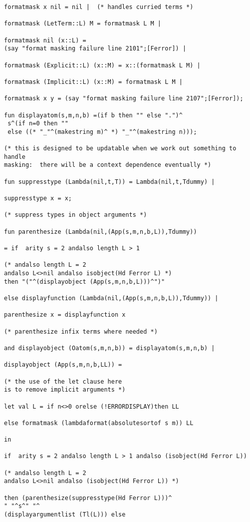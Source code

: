 \documentclass[12pt]{article}
\begin{document}
\begin{verbatim}
formatmask x nil = nil |  (* handles curried terms *)

formatmask (LetTerm::L) M = formatmask L M |

formatmask nil (x::L) = 
(say "format masking failure line 2101";[Ferror]) |

formatmask (Explicit::L) (x::M) = x::(formatmask L M) |

formatmask (Implicit::L) (x::M) = formatmask L M |

formatmask x y = (say "format masking failure line 2107";[Ferror]);

fun displayatom(s,m,n,b) =(if b then "" else ".")^
 s^(if n=0 then "" 
 else ((* "_"^(makestring m)^ *) "_"^(makestring n)));

(* this is designed to be updatable when we work out something to handle
masking:  there will be a context dependence eventually *)

fun suppresstype (Lambda(nil,t,T)) = Lambda(nil,t,Tdummy) |

suppresstype x = x;

(* suppress types in object arguments *)

fun parenthesize (Lambda(nil,(App(s,m,n,b,L)),Tdummy))

= if  arity s = 2 andalso length L > 1

(* andalso length L = 2
andalso L<>nil andalso isobject(Hd Ferror L) *)
then "("^(displayobject (App(s,m,n,b,L)))^")"

else displayfunction (Lambda(nil,(App(s,m,n,b,L)),Tdummy)) |

parenthesize x = displayfunction x

(* parenthesize infix terms where needed *)

and displayobject (Oatom(s,m,n,b)) = displayatom(s,m,n,b) |

displayobject (App(s,m,n,b,LL)) = 

(* the use of the let clause here
is to remove implicit arguments *)

let val L = if n<>0 orelse (!ERRORDISPLAY)then LL

else formatmask (lambdaformat(absolutesortof s m)) LL

in

if  arity s = 2 andalso length L > 1 andalso (isobject(Hd Ferror L))

(* andalso length L = 2
andalso L<>nil andalso (isobject(Hd Ferror L)) *)

then (parenthesize(suppresstype(Hd Ferror L)))^
" "^s^" "^
(displayargumentlist (Tl(L))) else


\end{verbatim}
\end{document}
